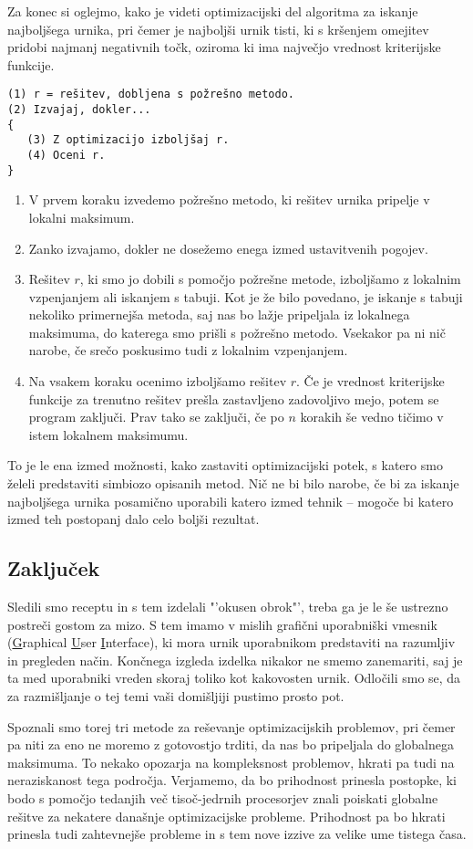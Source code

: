 \documentclass[10pt, a4paper]{article}
\begin{document}
Za konec si oglejmo, kako je videti optimizacijski del algoritma za iskanje najboljšega
urnika, pri čemer je najboljši urnik tisti, ki s kršenjem omejitev pridobi najmanj negativnih
točk, oziroma ki ima največjo vrednost kriterijske funkcije.
\begin{verbatim}
(1) r = rešitev, dobljena s požrešno metodo.
(2) Izvajaj, dokler...
{
   (3) Z optimizacijo izboljšaj r.
   (4) Oceni r.
}
\end{verbatim}
\begin{enumerate}
   \item
      V prvem koraku izvedemo požrešno metodo, ki rešitev urnika pripelje v lokalni maksimum.
   \item
      Zanko izvajamo, dokler ne dosežemo enega izmed ustavitvenih pogojev.
   \item
      Rešitev $r$, ki smo jo dobili s pomočjo požrešne metode, izboljšamo z lokalnim vzpenjanjem
      ali iskanjem s tabuji. Kot je že bilo povedano, je iskanje s tabuji nekoliko primernejša metoda,
      saj nas bo lažje pripeljala iz lokalnega maksimuma, do katerega smo prišli s požrešno metodo.
      Vsekakor pa ni nič narobe, če srečo poskusimo tudi z lokalnim vzpenjanjem.
   \item
      Na vsakem koraku ocenimo izboljšamo rešitev $r$. Če je vrednost kriterijske funkcije
      za trenutno rešitev prešla zastavljeno zadovoljivo mejo, potem se program zaključi. Prav tako
      se zaključi, če po $n$ korakih še vedno tičimo v istem lokalnem maksimumu.
\end{enumerate}
To je le ena izmed možnosti, kako zastaviti optimizacijski potek, s katero smo želeli predstaviti
simbiozo opisanih metod. Nič ne bi bilo narobe, če bi za iskanje najboljšega urnika posamično
uporabili katero izmed tehnik -- mogoče bi katero izmed teh postopanj dalo celo boljši rezultat.

\subsection{Zaključek}

Sledili smo receptu in s tem izdelali "'okusen obrok"', treba ga je le še ustrezno postreči
gostom za mizo. S tem imamo v mislih grafični uporabniški vmesnik (\underline{G}raphical
\underline{U}ser \underline{I}nterface), ki mora urnik uporabnikom predstaviti na razumljiv in
pregleden način. Končnega izgleda izdelka nikakor ne smemo zanemariti, saj je ta med uporabniki
vreden skoraj toliko kot kakovosten urnik. Odločili smo se, da za razmišljanje o tej temi vaši
domišljiji pustimo prosto pot.

Spoznali smo torej tri metode za reševanje optimizacijskih problemov, pri čemer pa niti za eno
ne moremo z gotovostjo trditi, da nas bo pripeljala do globalnega maksimuma. To nekako opozarja
na kompleksnost problemov, hkrati pa tudi na neraziskanost tega področja. Verjamemo, da bo
prihodnost prinesla postopke, ki bodo s pomočjo tedanjih več tisoč-jedrnih procesorjev znali
poiskati globalne rešitve za nekatere današnje optimizacijske probleme. Prihodnost pa bo
hkrati prinesla tudi zahtevnejše probleme in s tem nove izzive za velike ume tistega časa.
\end{document}
